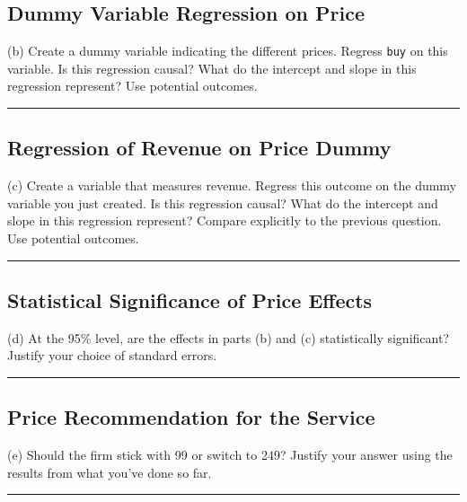 \documentclass{article}
\newenvironment{colorparagraph}[1]{\par\color{#1}}{\par}
\begin{document}
\begin{colorparagraph}{questioncolor}
\label{q3b}\subsection{Dummy Variable Regression on Price}
(b) Create a dummy variable indicating the different prices. Regress \texttt{buy} on this variable. Is this regression causal? What do the intercept and slope in this regression represent? Use potential outcomes.

\rule{\textwidth}{0.5pt}
\end{colorparagraph}

\begin{colorparagraph}{questioncolor}
\label{q3c}\subsection{Regression of Revenue on Price Dummy}
(c) Create a variable that measures revenue. Regress this outcome on the dummy variable you just created. Is this regression causal? What do the intercept and slope in this regression represent? Compare explicitly to the previous question. Use potential outcomes.

\rule{\textwidth}{0.5pt}
\end{colorparagraph}

\begin{colorparagraph}{questioncolor}
\label{q3d}\subsection{Statistical Significance of Price Effects}
(d) At the 95\% level, are the effects in parts (b) and (c) statistically significant? Justify your choice of standard errors.

\rule{\textwidth}{0.5pt}
\end{colorparagraph}

\begin{colorparagraph}{questioncolor}
\label{q3e}\subsection{Price Recommendation for the Service}
(e) Should the firm stick with 99 or switch to 249? Justify your answer using the results from what you’ve done so far.

\rule{\textwidth}{0.5pt}
\end{colorparagraph}
\end{document}
